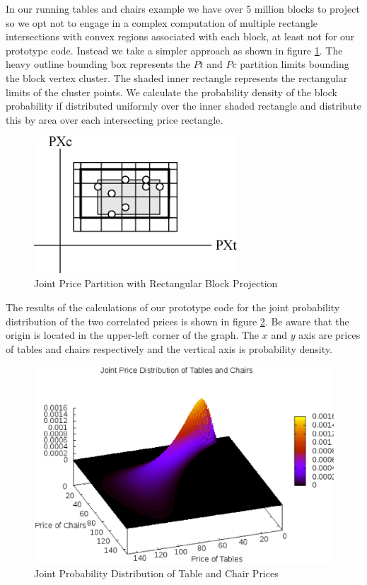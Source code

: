 In our running tables and chairs example we have over 5 million blocks
to project so we opt not to engage in a complex computation of
multiple rectangle intersections with convex regions associated with
each block, at least not for our prototype code. Instead we take a
simpler approach as shown in figure
\ref{fig:ptc_rectange_rectangle}. The heavy outline bounding box
represents the $Pt$ and $Pc$ partition limits bounding the block
vertex cluster. The shaded inner rectangle represents the rectangular
limits of the cluster points. We calculate the probability density of
the block probability if distributed uniformly over the inner shaded
rectangle and distribute this by area over each intersecting price
rectangle. 

\begin{figure}
  \centering
  \includegraphics[width=3in]{Images/ptc_rectangle_rectangle}
  \caption[Joint Price Partition with Rectangular Block Projection]
          {Joint Price Partition with Rectangular Block Projection}
  \label{fig:ptc_rectange_rectangle}
\end{figure}

The results of the calculations of our prototype code for the joint
probability distribution of the two correlated prices is shown in
figure \ref{fig:Ptc}. Be aware that the origin is located in the
upper-left corner of the graph. The $x$ and $y$ axis are prices of
tables and chairs respectively and the vertical axis is probability density.

\begin{figure}
  \centering
  \includegraphics[width=120mm]{Images/Ptc.eps}
  \caption[Joint Probability Distribution of Table and Chair Prices]
          {Joint Probability Distribution of Table and Chair Prices}
  \label{fig:Ptc}
\end{figure}

